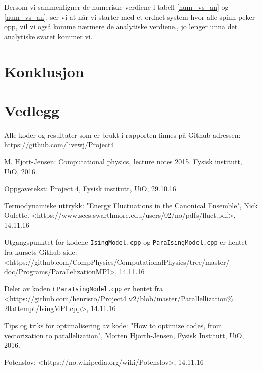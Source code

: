 \documentclass[11pt,a4paper]{article}
\begin{document}
Dersom vi sammenligner de numeriske verdiene i tabell \ref{num_vs_an} og \ref{num_vs_an}, ser vi at når vi starter med et ordnet system hvor alle spinn peker opp, vil vi også komme nærmere de analytiske verdiene., jo lenger unna det analytiske svaret kommer vi. 

\section{Konklusjon}

\section{Vedlegg}
Alle koder og resultater som er brukt i rapporten finnes på Github-adressen: \\
https://github.com/livewj/Project4



\begin{thebibliography}{9}  
    
\bibitem{}
   M. Hjort-Jensen: Computational physics, lecture notes 2015. Fysisk institutt, UiO, 2016.

\bibitem{}
   Oppgavetekst: Project 4, Fysisk institutt, UiO, 29.10.16
   
 \bibitem{}
   Termodynamiske uttrykk: "Energy Fluctuations in the Canonical Ensemble", Nick Oulette. <https://www.sccs.swarthmore.edu/users/02/no/pdfs/fluct.pdf>, 14.11.16
  
  \bibitem{}
  Utgangspunktet for kodene \texttt{IsingModel.cpp} og \texttt{ParaIsingModel.cpp} er hentet fra kursets Github-side:
  <https://github.com/CompPhysics/ComputationalPhysics/tree/master/\\
  doc/Programs/ParallelizationMPI>, 14.11.16
  
\bibitem{}
  Deler av koden i \texttt{ParaIsingModel.cpp} er hentet fra \\ <https://github.com/henrisro/Project4$\_$v2/blob/master/Parallellization$\%$20attempt/IsingMPI.cpp>,
  14.11.16

\bibitem{}
 Tips og triks for optimalisering av kode:
 "How to optimize codes, from vectorization to parallelization", Morten Hjorth-Jensen, Fysisk Institutt, UiO, 2016.
 
\bibitem{}
  Potenslov:
 <https://no.wikipedia.org/wiki/Potenslov>, 14.11.16

   
\end{thebibliography}
\end{document}
